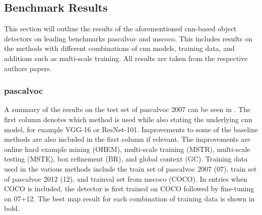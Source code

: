 \subsection{Benchmark Results}\label{sec:benchresults}

This section will outline the results of the aforementioned \gls{cnn}-based object detectors on leading benchmarks \gls{pascalvoc} and \gls{mscoco}. This includes results on the methods with different combinations of \gls{cnn} models, training data, and additions such as multi-scale training. All results are taken from the respective authors papers.

\subsubsection{\gls{pascalvoc}}
A summary of the results on the test set of \gls{pascalvoc} 2007 can be seen in . The first column denotes which method is used while also stating the underlying \gls{cnn} model, for example VGG-16 or ResNet-101. Improvements to some of the baseline methods are also included in the first column if relevant. The improvements are online hard example mining (OHEM), multi-scale training (MSTR), multi-scale testing (MSTE), box refinement (BR), and global context (GC). Training data used in the various methods include the train set of \gls{pascalvoc} 2007 (07), train set of \gls{pascalvoc} 2012 (12), and trainval set from \gls{mscoco} (COCO). In entries when COCO is included, the detector is first trained on COCO followed by fine-tuning on 07+12. The best \gls{map} result for each combination of training data is shown in bold.


